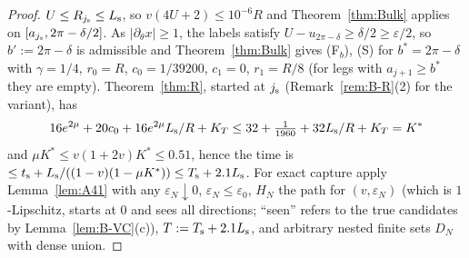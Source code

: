 \begin{proof}
$U\le R_{j_{\mathrm s}}\le L_{\mathrm s}$, so $v(4U+2)\le10^{-6}R$ and Theorem~\ref{thm:Bulk} applies on $[a_{j_{\mathrm s}},2\pi-\delta/2]$. As
$|\partial_\theta x|\ge1$, the labels satisfy $U-u_{2\pi-\delta}\ge\delta/2\ge\varepsilon/2$, so $b':=2\pi-\delta$ is admissible and
Theorem~\ref{thm:Bulk} gives \textup{(F$_b$)}, \textup{(S)} for $b^*=2\pi-\delta$ with $\gamma=1/4$, $r_0=R$, $c_0=1/39200$, $c_1=0$,
$r_1=R/8$ (for legs with $a_{j+1}\ge b^*$ they are empty). Theorem~\ref{thm:R}, started at $j_{\mathrm s}$ (Remark~\ref{rem:B-R}(2) for the
variant), has
\[
16e^{2\mu}+20c_0+16e^{2\mu}L_{\mathrm s}/R+K_T\le32+\tfrac1{1960}+32L_{\mathrm s}/R+K_T=K^*
\]
and $\mu K^*\le v(1+2v)K^*\le0.51$, hence the time is $\le t_{\mathrm s}+L_{\mathrm s}/((1-v)(1-\mu K^*))\le T_{\mathrm s}+2.1L_{\mathrm s}$. For exact capture apply
Lemma~\ref{lem:A41} with any $\varepsilon_N\downarrow0$, $\varepsilon_N\le\varepsilon_0$, $H_N$ the path for $(v,\varepsilon_N)$
(which is $1$-Lipschitz, starts at $0$ and sees all directions; ``seen'' refers to the true candidates by
Lemma~\ref{lem:B-VC}(c)), $T:=T_{\mathrm s}+2.1L_{\mathrm s}$, and arbitrary nested finite sets $D_N$ with dense union.
\end{proof}

